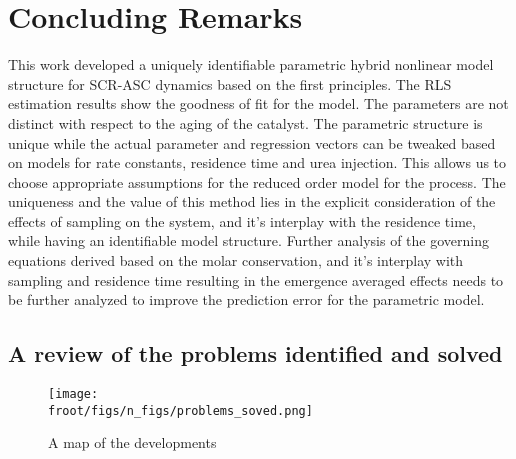 \newpage
\section{Concluding Remarks}
This work developed a uniquely identifiable parametric hybrid nonlinear model structure for SCR-ASC dynamics based on
the first principles. The RLS estimation results show the goodness of fit for the model. The parameters are not distinct
with respect to the aging of the catalyst. The parametric structure is unique while the actual parameter and regression
vectors can be tweaked based on models for rate constants, residence time and urea injection. This allows us to choose
appropriate assumptions for the reduced order model for the process. The uniqueness and the value of this method lies in
the explicit consideration of the effects of sampling on the system, and it's interplay with the residence time, while
having an identifiable model structure. Further analysis of the governing equations derived based on the molar
conservation, and it's interplay with sampling and residence time resulting in the emergence averaged effects needs to
be further analyzed to improve the prediction error for the parametric model.


\subsection{A review of the problems identified and solved}

\begin{figure}[H]
        \centering
        \texttt{[image: \\froot/figs/n\_figs/problems\_soved.png]}
        \caption{A map of the developments}
\end{figure}
